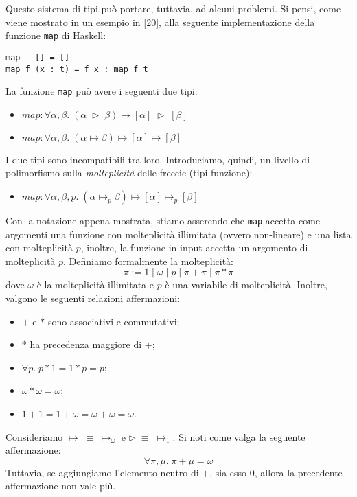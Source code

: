 \documentclass[10pt,a4paper]{article}
\begin{document}
Questo sistema di tipi può portare, tuttavia, ad alcuni problemi. Si pensi, come viene mostrato in un esempio in [20],
alla seguente implementazione della funzione \texttt{map} di Haskell:
\begin{lstlisting}
map _ [] = []
map f (x : t) = f x : map f t
\end{lstlisting}
La funzione \texttt{map} può avere i seguenti due tipi:
\begin{itemize}
    \item $ map : \forall \alpha, \beta. \; (\alpha \; \triangleright \; \beta) \mapsto [\alpha] \; \triangleright \; [\beta] $
    \item $ map : \forall \alpha, \beta. \; (\alpha \mapsto \beta) \mapsto [\alpha] \mapsto [\beta] $
\end{itemize}
I due tipi sono incompatibili tra loro. Introduciamo, quindi, un livello di polimorfismo sulla
\textit{molteplicità} delle freccie (tipi funzione):
\begin{itemize}
    \item $ map : \forall \alpha, \beta, p. \; (\alpha \mapsto_p \beta) \mapsto [\alpha] \mapsto_p [\beta] $
\end{itemize}
Con la notazione appena mostrata, stiamo asserendo che \texttt{map} accetta come argomenti una funzione con molteplicità
illimitata (ovvero non-lineare) e una lista con molteplicità $ p $, inoltre, la funzione in input accetta un argomento
di molteplicità $ p $. Definiamo formalmente la molteplicità:
\[ \pi := 1 \; | \; \omega \; | \; p \; | \; \pi + \pi \; | \; \pi * \pi \]
dove $ \omega $ è la molteplicità illimitata e $ p $ è una variabile di molteplicità. Inoltre, valgono le seguenti
relazioni affermazioni:
\begin{itemize}
    \item $ + $ e $ * $ sono associativi e commutativi;
    \item $ * $ ha precedenza maggiore di $ + $;
    \item $ \forall p. \; p * 1 = 1 * p = p $;
    \item $ \omega * \omega = \omega $;
    \item $ 1 + 1 = 1 + \omega = \omega + \omega = \omega $.
\end{itemize}
Consideriamo $ \mapsto \; \equiv \; \mapsto_{\omega} $ e $ \triangleright \; \equiv \; \mapsto_1 $. Si noti come valga
la seguente affermazione:
\[ \forall \pi, \mu. \; \pi + \mu = \omega \]
Tuttavia, se aggiungiamo l'elemento neutro di $ + $, sia esso $ 0 $, allora la precedente affermazione non vale più.
\end{document}

